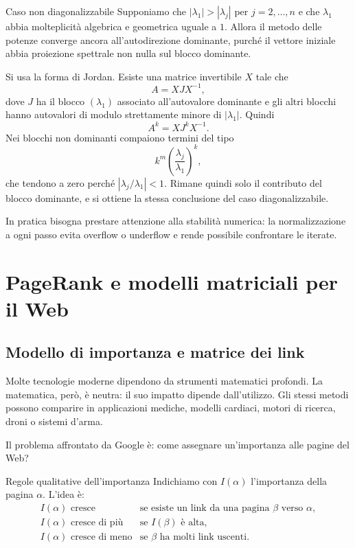 \documentclass[a4paper]{article}
\begin{document}
\begin{snippetproposition}{Caso non diagonalizzabile}
    Supponiamo che \(|\lambda_1|>|\lambda_j|\) per \(j=2,
    \ldots,n\) e che \(\lambda_1\) abbia molteplicità algebrica e geometrica uguale a \(1\). Allora il metodo delle potenze converge ancora all'autodirezione dominante, purché il vettore iniziale abbia proiezione spettrale non nulla sul blocco dominante.
\end{snippetproposition}

\begin{snippetproof}{}
    Si usa la forma di Jordan. Esiste una matrice invertibile \(X\) tale che
    \[
        A=XJX^{-1},
    \]
    dove \(J\) ha il blocco \((\lambda_1)\) associato all'autovalore dominante e gli altri blocchi hanno autovalori di modulo strettamente minore di \(|\lambda_1|\). Quindi
    \[
        A^k=XJ^kX^{-1}.
    \]
    Nei blocchi non dominanti compaiono termini del tipo
    \[
        k^m\left(\frac{\lambda_j}{\lambda_1}\right)^k,
    \]
    che tendono a zero perché \(|\lambda_j/\lambda_1|<1\). Rimane quindi solo il contributo del blocco dominante, e si ottiene la stessa conclusione del caso diagonalizzabile.
\end{snippetproof}

In pratica bisogna prestare attenzione alla stabilità numerica: la normalizzazione a ogni passo evita overflow o underflow e rende possibile confrontare le iterate.

\section{PageRank e modelli matriciali per il Web}

\subsection{Modello di importanza e matrice dei link}

Molte tecnologie moderne dipendono da strumenti matematici profondi. La matematica, però, è neutra: il suo impatto dipende dall'utilizzo. Gli stessi metodi possono comparire in applicazioni mediche, modelli cardiaci, motori di ricerca, droni o sistemi d'arma.

Il problema affrontato da Google è: come assegnare un'importanza alle pagine del Web?

\begin{snippetdefinition}{Regole qualitative dell'importanza}
    Indichiamo con \(I(\alpha)\) l'importanza della pagina \(\alpha\). L'idea è:
    \[
        \begin{array}{ll}
            I(\alpha) \text{ cresce} & \text{se esiste un link da una pagina } \beta \text{ verso } \alpha,\\
            I(\alpha) \text{ cresce di più} & \text{se } I(\beta) \text{ è alta},\\
            I(\alpha) \text{ cresce di meno} & \text{se } \beta \text{ ha molti link uscenti}.
        \end{array}
    \]
\end{snippetdefinition}
\end{document}
